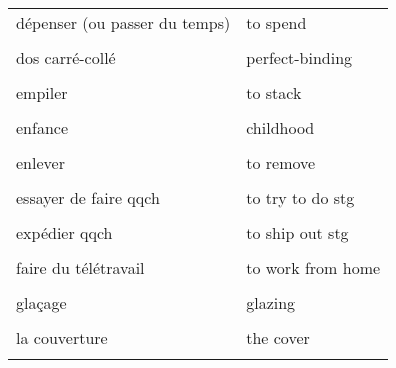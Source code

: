 \documentclass[
  10pt,
]{article}
\begin{document}
\begin{longtable}{ll}
dépenser (ou passer du temps) & to spend\\

\cellcolor{gray!6}{dorure à chaud} & \cellcolor{gray!6}{hot foil stamping}\\

dos carré-collé & perfect-binding\\

\cellcolor{gray!6}{écorce} & \cellcolor{gray!6}{bark (U)}\\

empiler & to stack\\

\cellcolor{gray!6}{encre} & \cellcolor{gray!6}{ink}\\

enfance & childhood\\

\cellcolor{gray!6}{ \vphantom{7}& }\\

\multirow[t]{-2}{*}{\raggedright\arraybackslash enlever} & \multirow[t]{-2}{*}{\raggedright\arraybackslash to remove}\\

\cellcolor{gray!6}{épaisseur} & \cellcolor{gray!6}{thickness}\\

essayer de faire qqch & to try to do stg\\

\cellcolor{gray!6}{être bon dans qqch} & \cellcolor{gray!6}{to be good  at stg}\\

expédier qqch & to ship out stg\\

\cellcolor{gray!6}{fabriquer qqch} & \cellcolor{gray!6}{to manufacture stg}\\

faire du télétravail & to work from home\\

\cellcolor{gray!6}{Français} & \cellcolor{gray!6}{English}\\
glaçage & glazing\\

\cellcolor{gray!6}{hauteur} & \cellcolor{gray!6}{height}\\

la couverture & the cover\\

\cellcolor{gray!6}{la graisse (typographie)} & \cellcolor{gray!6}{the weight}\\


\end{longtable}
\end{document}
